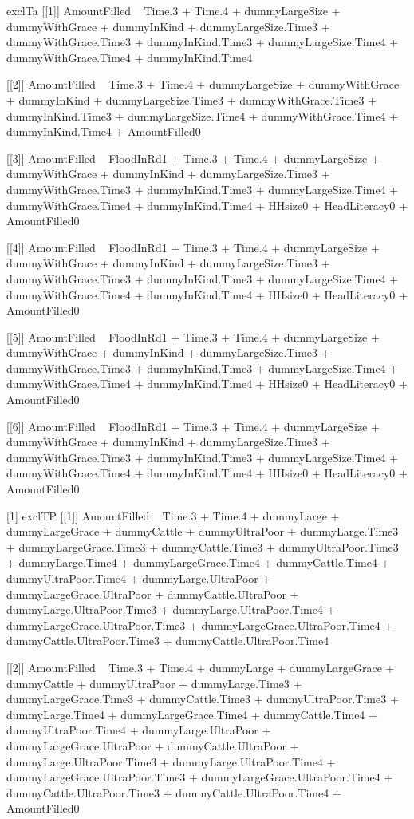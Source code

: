 \begin{Schunk}
\begin{Soutput}
[1] exclTa
[[1]]
AmountFilled ~ Time.3 + Time.4 + dummyLargeSize + dummyWithGrace + 
    dummyInKind + dummyLargeSize.Time3 + dummyWithGrace.Time3 + 
    dummyInKind.Time3 + dummyLargeSize.Time4 + dummyWithGrace.Time4 + 
    dummyInKind.Time4

[[2]]
AmountFilled ~ Time.3 + Time.4 + dummyLargeSize + dummyWithGrace + 
    dummyInKind + dummyLargeSize.Time3 + dummyWithGrace.Time3 + 
    dummyInKind.Time3 + dummyLargeSize.Time4 + dummyWithGrace.Time4 + 
    dummyInKind.Time4 + AmountFilled0

[[3]]
AmountFilled ~ FloodInRd1 + Time.3 + Time.4 + dummyLargeSize + 
    dummyWithGrace + dummyInKind + dummyLargeSize.Time3 + dummyWithGrace.Time3 + 
    dummyInKind.Time3 + dummyLargeSize.Time4 + dummyWithGrace.Time4 + 
    dummyInKind.Time4 + HHsize0 + HeadLiteracy0 + AmountFilled0

[[4]]
AmountFilled ~ FloodInRd1 + Time.3 + Time.4 + dummyLargeSize + 
    dummyWithGrace + dummyInKind + dummyLargeSize.Time3 + dummyWithGrace.Time3 + 
    dummyInKind.Time3 + dummyLargeSize.Time4 + dummyWithGrace.Time4 + 
    dummyInKind.Time4 + HHsize0 + HeadLiteracy0 + AmountFilled0

[[5]]
AmountFilled ~ FloodInRd1 + Time.3 + Time.4 + dummyLargeSize + 
    dummyWithGrace + dummyInKind + dummyLargeSize.Time3 + dummyWithGrace.Time3 + 
    dummyInKind.Time3 + dummyLargeSize.Time4 + dummyWithGrace.Time4 + 
    dummyInKind.Time4 + HHsize0 + HeadLiteracy0 + AmountFilled0

[[6]]
AmountFilled ~ FloodInRd1 + Time.3 + Time.4 + dummyLargeSize + 
    dummyWithGrace + dummyInKind + dummyLargeSize.Time3 + dummyWithGrace.Time3 + 
    dummyInKind.Time3 + dummyLargeSize.Time4 + dummyWithGrace.Time4 + 
    dummyInKind.Time4 + HHsize0 + HeadLiteracy0 + AmountFilled0

[1] exclTP
[[1]]
AmountFilled ~ Time.3 + Time.4 + dummyLarge + dummyLargeGrace + 
    dummyCattle + dummyUltraPoor + dummyLarge.Time3 + dummyLargeGrace.Time3 + 
    dummyCattle.Time3 + dummyUltraPoor.Time3 + dummyLarge.Time4 + 
    dummyLargeGrace.Time4 + dummyCattle.Time4 + dummyUltraPoor.Time4 + 
    dummyLarge.UltraPoor + dummyLargeGrace.UltraPoor + dummyCattle.UltraPoor + 
    dummyLarge.UltraPoor.Time3 + dummyLarge.UltraPoor.Time4 + 
    dummyLargeGrace.UltraPoor.Time3 + dummyLargeGrace.UltraPoor.Time4 + 
    dummyCattle.UltraPoor.Time3 + dummyCattle.UltraPoor.Time4

[[2]]
AmountFilled ~ Time.3 + Time.4 + dummyLarge + dummyLargeGrace + 
    dummyCattle + dummyUltraPoor + dummyLarge.Time3 + dummyLargeGrace.Time3 + 
    dummyCattle.Time3 + dummyUltraPoor.Time3 + dummyLarge.Time4 + 
    dummyLargeGrace.Time4 + dummyCattle.Time4 + dummyUltraPoor.Time4 + 
    dummyLarge.UltraPoor + dummyLargeGrace.UltraPoor + dummyCattle.UltraPoor + 
    dummyLarge.UltraPoor.Time3 + dummyLarge.UltraPoor.Time4 + 
    dummyLargeGrace.UltraPoor.Time3 + dummyLargeGrace.UltraPoor.Time4 + 
    dummyCattle.UltraPoor.Time3 + dummyCattle.UltraPoor.Time4 + 
    AmountFilled0


\end{Soutput}
\end{Schunk}
